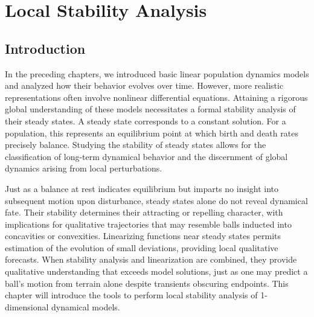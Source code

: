 \chapter{Local Stability Analysis}
\label{ch:06} 



\vspace{1cm}

\section{Introduction}

In the preceding chapters, we introduced basic linear population dynamics models and analyzed how their behavior evolves over time. However, more realistic representations often involve nonlinear differential equations. Attaining a rigorous global understanding of these models necessitates a formal stability analysis of their steady states. A steady state corresponds to a constant solution. For a population, this represents an equilibrium point at which birth and death rates precisely balance. Studying the stability of steady states allows for the classification of long-term dynamical behavior and the discernment of global dynamics arising from local perturbations.

Just as a balance at rest indicates equilibrium but imparts no insight into subsequent motion upon disturbance, steady states alone do not reveal dynamical fate. Their stability determines their attracting or repelling character, with implications for qualitative trajectories that may resemble balls inducted into concavities or convexities. Linearizing functions near steady states permits estimation of the evolution of small deviations, providing local qualitative forecasts. When stability analysis and linearization are combined, they provide qualitative understanding that exceeds model solutions, just as one may predict a ball's motion from terrain alone despite transients obscuring endpoints. This chapter will introduce the tools to perform local stability analysis of 1-dimensional dynamical models.

